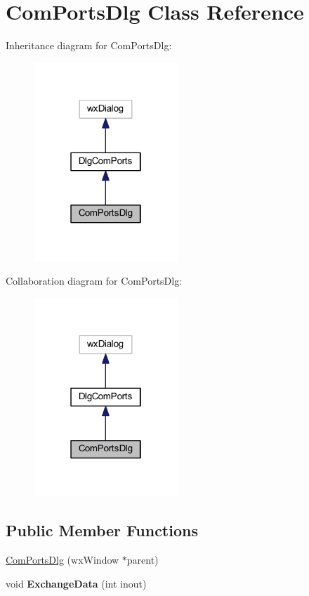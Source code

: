 \hypertarget{class_com_ports_dlg}{\section{Com\-Ports\-Dlg Class Reference}
\label{class_com_ports_dlg}
}


Inheritance diagram for Com\-Ports\-Dlg\-:\nopagebreak
\begin{figure}[H]
\begin{center}
\leavevmode
\includegraphics[width=154pt]{class_com_ports_dlg__inherit__graph}
\end{center}
\end{figure}


Collaboration diagram for Com\-Ports\-Dlg\-:\nopagebreak
\begin{figure}[H]
\begin{center}
\leavevmode
\includegraphics[width=154pt]{class_com_ports_dlg__coll__graph}
\end{center}
\end{figure}
\subsection*{Public Member Functions}
\begin{DoxyCompactItemize}
\item 
\hyperlink{class_com_ports_dlg_a02f8415185ed657f0263ae795e2b4f04}{Com\-Ports\-Dlg} (wx\-Window $\ast$parent)
\item 
\hypertarget{class_com_ports_dlg_a767cb0ffb8904e2bb95500984f1b7025}{void {\bfseries Exchange\-Data} (int inout)}\label{class_com_ports_dlg_a767cb0ffb8904e2bb95500984f1b7025}

\end{DoxyCompactItemize}
